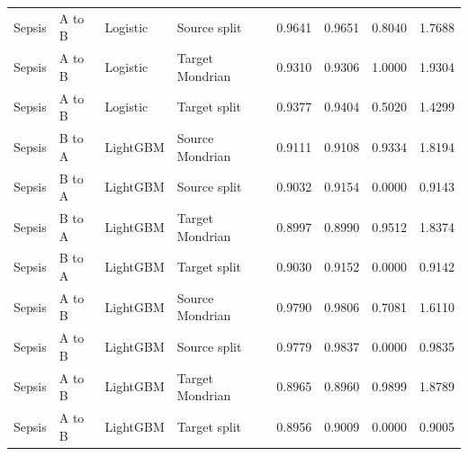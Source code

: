 \begin{longtable}{L{1cm}L{1.3cm}L{1.6cm}L{3.1cm}rrrr}
Sepsis & A to B & Logistic & Source split & 0.9641 & 0.9651 & 0.8040 & 1.7688 \\
Sepsis & A to B & Logistic & Target Mondrian & 0.9310 & 0.9306 & 1.0000 & 1.9304 \\
Sepsis & A to B & Logistic & Target split & 0.9377 & 0.9404 & 0.5020 & 1.4299 \\
Sepsis & B to A & LightGBM & Source Mondrian & 0.9111 & 0.9108 & 0.9334 & 1.8194 \\
Sepsis & B to A & LightGBM & Source split & 0.9032 & 0.9154 & 0.0000 & 0.9143 \\
Sepsis & B to A & LightGBM & Target Mondrian & 0.8997 & 0.8990 & 0.9512 & 1.8374 \\
Sepsis & B to A & LightGBM & Target split & 0.9030 & 0.9152 & 0.0000 & 0.9142 \\
Sepsis & A to B & LightGBM & Source Mondrian & 0.9790 & 0.9806 & 0.7081 & 1.6110 \\
Sepsis & A to B & LightGBM & Source split & 0.9779 & 0.9837 & 0.0000 & 0.9835 \\
Sepsis & A to B & LightGBM & Target Mondrian & 0.8965 & 0.8960 & 0.9899 & 1.8789 \\
Sepsis & A to B & LightGBM & Target split & 0.8956 & 0.9009 & 0.0000 & 0.9005 \\
\end{longtable}
